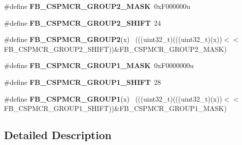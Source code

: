 \begin{DoxyCompactItemize}
\item 
\hypertarget{group___f_b___register___masks_ga594596b281baba23e03cb37fbf0a05db}{}\#define {\bfseries F\+B\+\_\+\+C\+S\+P\+M\+C\+R\+\_\+\+G\+R\+O\+U\+P2\+\_\+\+M\+A\+S\+K}~0x\+F000000u\label{group___f_b___register___masks_ga594596b281baba23e03cb37fbf0a05db}

\item 
\hypertarget{group___f_b___register___masks_ga332a2c4e7103b2f21af54da036518928}{}\#define {\bfseries F\+B\+\_\+\+C\+S\+P\+M\+C\+R\+\_\+\+G\+R\+O\+U\+P2\+\_\+\+S\+H\+I\+F\+T}~24\label{group___f_b___register___masks_ga332a2c4e7103b2f21af54da036518928}

\item 
\hypertarget{group___f_b___register___masks_ga28e850f531a9d3b6c9415983a5f5727f}{}\#define {\bfseries F\+B\+\_\+\+C\+S\+P\+M\+C\+R\+\_\+\+G\+R\+O\+U\+P2}(x)                                        ~(((uint32\+\_\+t)(((uint32\+\_\+t)(x))$<$$<$F\+B\+\_\+\+C\+S\+P\+M\+C\+R\+\_\+\+G\+R\+O\+U\+P2\+\_\+\+S\+H\+I\+F\+T))\&F\+B\+\_\+\+C\+S\+P\+M\+C\+R\+\_\+\+G\+R\+O\+U\+P2\+\_\+\+M\+A\+S\+K)\label{group___f_b___register___masks_ga28e850f531a9d3b6c9415983a5f5727f}

\item 
\hypertarget{group___f_b___register___masks_ga735fd2a0040e9ad1122a3c3fc8e28193}{}\#define {\bfseries F\+B\+\_\+\+C\+S\+P\+M\+C\+R\+\_\+\+G\+R\+O\+U\+P1\+\_\+\+M\+A\+S\+K}~0x\+F0000000u\label{group___f_b___register___masks_ga735fd2a0040e9ad1122a3c3fc8e28193}

\item 
\hypertarget{group___f_b___register___masks_ga9c83850dcb3efe92a0404101e5afbdca}{}\#define {\bfseries F\+B\+\_\+\+C\+S\+P\+M\+C\+R\+\_\+\+G\+R\+O\+U\+P1\+\_\+\+S\+H\+I\+F\+T}~28\label{group___f_b___register___masks_ga9c83850dcb3efe92a0404101e5afbdca}

\item 
\hypertarget{group___f_b___register___masks_ga9a5a66bff196c0cdfac5a0b293e5ca6a}{}\#define {\bfseries F\+B\+\_\+\+C\+S\+P\+M\+C\+R\+\_\+\+G\+R\+O\+U\+P1}(x)                                        ~(((uint32\+\_\+t)(((uint32\+\_\+t)(x))$<$$<$F\+B\+\_\+\+C\+S\+P\+M\+C\+R\+\_\+\+G\+R\+O\+U\+P1\+\_\+\+S\+H\+I\+F\+T))\&F\+B\+\_\+\+C\+S\+P\+M\+C\+R\+\_\+\+G\+R\+O\+U\+P1\+\_\+\+M\+A\+S\+K)\label{group___f_b___register___masks_ga9a5a66bff196c0cdfac5a0b293e5ca6a}

\end{DoxyCompactItemize}


\subsection{Detailed Description}
